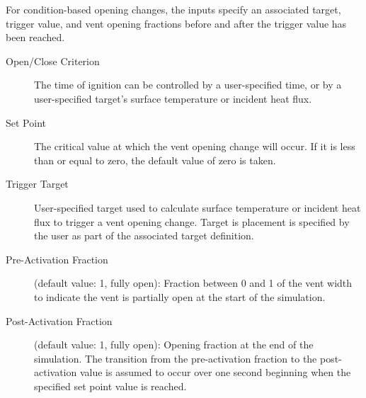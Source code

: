 For condition-based opening changes, the inputs specify an associated target, trigger value, and vent opening fractions before and after the trigger value has been reached.

\begin{description}
\item[Open/Close Criterion] The time of ignition can be controlled by a user-specified time, or by a user-specified target's surface temperature or incident heat flux.
\item[Set Point] The critical value at which the vent opening change will occur. If it is less than or equal to zero, the default value of zero is taken.
\item[Trigger Target] User-specified target used to calculate surface temperature or incident heat flux to trigger a vent opening change. Target is placement is specified by the user as part of the associated target definition.
\item[Pre-Activation Fraction] (default value: 1, fully open): Fraction between 0 and 1 of the vent width to indicate the vent is partially open at the start of the simulation.
\item[Post-Activation Fraction] (default value: 1, fully open): Opening fraction at the end of the simulation. The transition from the pre-activation fraction to the post-activation value is assumed to occur over one second beginning when the specified set point value is reached.
\end{description}





